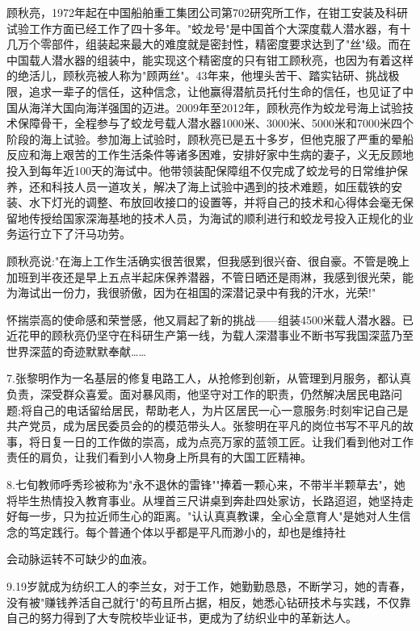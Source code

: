 \documentclass[UTF8]{ctexart}
\begin{document}
顾秋亮，1972年起在中国船舶重工集团公司第702研究所工作，在钳工安装及科研试验工作方面已经工作了四十多年。"蛟龙号"是中国首个大深度载人潜水器，有十几万个零部件，组装起来最大的难度就是密封性，精密度要求达到了"丝"级。而在中国载人潜水器的组装中，能实现这个精密度的只有钳工顾秋亮，也因为有着这样的绝活儿，顾秋亮被人称为"顾两丝"。43年来，他埋头苦干、踏实钻研、挑战极限，追求一辈子的信任，这种信念，让他赢得潜航员托付生命的信任，也见证了中国从海洋大国向海洋强国的迈进。2009年至2012年，顾秋亮作为蛟龙号海上试验技术保障骨干，全程参与了蛟龙号载人潜水器1000米、3000米、5000米和7000米四个阶段的海上试验。参加海上试验时，顾秋亮已是五十多岁，但他克服了严重的晕船反应和海上艰苦的工作生活条件等诸多困难，安排好家中生病的妻子，义无反顾地投入到每年近100天的海试中。他带领装配保障组不仅完成了蛟龙号的日常维护保养，还和科技人员一道攻关，解决了海上试验中遇到的技术难题，如压载铁的安装、水下灯光的调整、布放回收接口的设置等，并将自己的技术和心得体会毫无保留地传授给国家深海基地的技术人员，为海试的顺利进行和蛟龙号投入正规化的业务运行立下了汗马功劳。\par
顾秋亮说:"在海上工作生活确实很苦很累，但我感到很兴奋、很自豪。不管是晚上加班到半夜还是早上五点半起床保养潜器，不管日晒还是雨淋，我感到很光荣，能为海试出一份力，我很骄傲，因为在祖国的深潜记录中有我的汗水，光荣!"\par
怀揣崇高的使命感和荣誉感，他又肩起了新的挑战——组装4500米载人潜水器。已近花甲的顾秋亮仍坚守在科研生产第一线，为载人深潜事业不断书写我国深蓝乃至世界深蓝的奇迹默默奉献……\par
7.张黎明作为一名基层的修复电路工人，从抢修到创新，从管理到月服务，都认真负责，深受群众喜爱。面对暴风雨，他坚守对工作的职责，仍然解决居民电路问题;将自己的电话留给居民，帮助老人，为片区居民一心一意服务;时刻牢记自己是共产党员，成为居民委员会的的模范带头人。张黎明在平凡的岗位书写不平凡的故事，将日复一日的工作做的崇高，成为点亮万家的蓝领工匠。让我们看到他对工作责任的肩负，让我们看到小人物身上所具有的大国工匠精神。\par
8.七旬教师呼秀珍被称为"永不退休的雷锋""捧着一颗心来，不带半半颗草去"，她将毕生热情投入教育事业。从埋首三尺讲桌到奔赴四处家访，长路迢迢，她坚持走好每一步，只为拉近师生心的距离。"认认真真教课，全心全意育人"是她对人生信念的笃定践行。每个普通个体以乎都是平凡而渺小的，却也是维持社\par
会动脉运转不可缺少的血液。\par
9.19岁就成为纺织工人的李兰女，对于工作，她勤勤恳恳，不断学习，她的青春，没有被"赚钱养活自己就行"的苟且所占据，相反，她悉心钻研技术与实践，不仅靠自己的努力得到了大专院校毕业证书，更成为了纺织业中的革新达人。\par
\newpage
\end{document}
